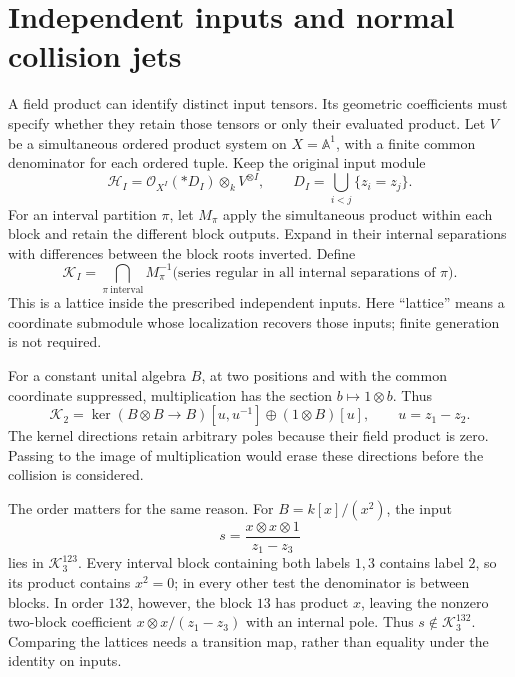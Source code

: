 \section{Independent inputs and normal collision jets}

A field product can identify distinct input tensors.
Its geometric coefficients must specify whether they
retain those tensors or only their evaluated product.
Let\label{e1f:def:independent-input-regular-lattice} \(V\) be a simultaneous ordered product system on
\(X=\mathbb A^1\), with a finite common denominator
for each ordered tuple. Keep the original input module
\[
 \mathcal H_I=\mathcal O_{X^I}(*D_I)\otimes_k V^{\otimes I},
 \qquad D_I=\bigcup_{i<j}\{z_i=z_j\}.
\]
For an interval partition \(\pi\), let \(M_\pi\)
apply the simultaneous product within each block and
retain the different block outputs. Expand in their
internal separations with differences between the block
roots inverted. Define
\[
 \mathcal K_I=\bigcap_{\pi\ \mathrm{interval}}
 M_\pi^{-1}\bigl(\text{series regular in all internal
                         separations of }\pi\bigr).
\]
This is a lattice inside the prescribed independent
inputs. Here ``lattice'' means a coordinate submodule
whose localization recovers those inputs; finite
generation is not required.

For a constant unital algebra \(B\), at two positions
and with the common coordinate suppressed, multiplication
has the section \(b\mapsto1\otimes b\). Thus
\[
 \mathcal K_2
 =\ker(B\otimes B\to B)[u,u^{-1}]
                      \oplus(1\otimes B)[u],
 \qquad u=z_1-z_2.
\]
The kernel directions retain arbitrary poles because
their field product is zero. Passing to the image of
multiplication would erase these directions before
the collision is considered.

The order matters for the same reason. For
\(B=k[x]/(x^2)\), the input
\[
 s=\frac{x\otimes x\otimes1}{z_1-z_3}
\]
lies in \(\mathcal K_3^{123}\). Every interval block
containing both labels \(1,3\) contains label \(2\),
so its product contains \(x^2=0\); in every other
test the denominator is between blocks. In order
\(132\), however, the block \(13\) has product
\(x\), leaving the nonzero two-block coefficient
\(x\otimes x/(z_1-z_3)\) with an internal pole.
Thus \(s\notin\mathcal K_3^{132}\). Comparing the
lattices needs a transition map, rather than equality
under the identity on inputs.

